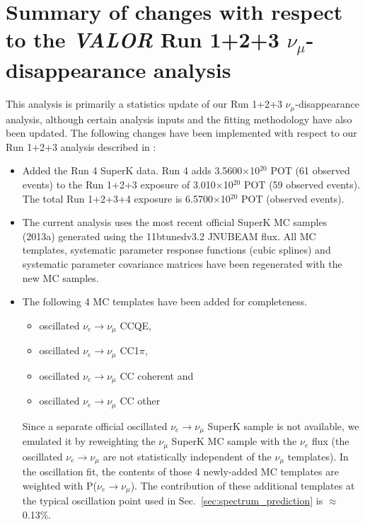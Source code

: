 
\section {Summary of changes with respect to the {\em VALOR} Run 1+2+3  $\nu_{\mu}$-disappearance analysis }
\label{sec:changes}

This analysis is primarily a statistics update of our Run 1+2+3 $\nu_{\mu}$-disappearance analysis,
although certain analysis inputs and the fitting methodology have also been updated.
The following changes have been implemented with respect to our Run 1+2+3 analysis described in \cite{OurRun123DisappAnalysis3Flavour}:

\begin{itemize}

\item
Added the Run 4 SuperK data. Run 4 adds 3.5600$\times$10$^{20}$ POT (61 observed events) to the Run 1+2+3 exposure
of 3.010$\times$10$^{20}$ POT (59 observed events). The total Run 1+2+3+4 exposure is 6.5700$\times$10$^{20}$ POT
(\NskObserved observed events).

\item
The current analysis uses the most recent official SuperK MC samples (2013a) 
generated using the 11btunedv3.2 JNUBEAM flux.
All MC templates, systematic parameter response functions (cubic splines)
and systematic parameter covariance matrices have been regenerated with the new MC samples.

\item
The following 4 MC templates have been added for completeness.
{
\begin{itemize}
\item  oscillated $\nu_{e} \rightarrow \nu_{\mu}$ CCQE,
\item  oscillated $\nu_{e} \rightarrow \nu_{\mu}$ CC1$\pi$,
\item  oscillated $\nu_{e} \rightarrow \nu_{\mu}$ CC coherent and
\item  oscillated $\nu_{e} \rightarrow \nu_{\mu}$ CC other
\end{itemize}
}
Since a separate official oscillated $\nu_{e} \rightarrow \nu_{\mu}$ SuperK sample is not available,
we emulated it by reweighting the $\nu_\mu$ SuperK MC sample with the $\nu_e$ flux
(the oscillated $\nu_{e} \rightarrow \nu_{\mu}$ are not statistically independent of the $\nu_\mu$ templates).
In the oscillation fit, the contents of those 4 newly-added MC templates are weighted 
with P($\nu_{e}\rightarrow\nu_{\mu}$).
The contribution of these additional templates at the typical oscillation point used in Sec.\ \ref{sec:spectrum_prediction}
is $\approx$0.13\%.


\end{itemize}

